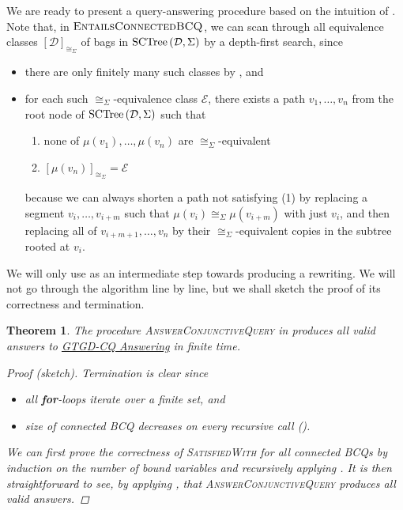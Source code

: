 \documentclass[12pt]{report}
\theoremstyle{plain}
\newtheorem{theorem}{Theorem}[chapter]
\theoremstyle{definition}
\newcommand{\SCTree}[2]{\ensuremath{\normalfont{\textrm{SCTree}} \left( #1, #2 \right)}}
\begin{document}
We are ready to present a query-answering procedure  based on the intuition of . Note that, in $\textsc{EntailsConnectedBCQ}$, we can scan through all equivalence classes $[\mathcal{D}]_{\cong_\Sigma}$ of bags in $\SCTree{\mathcal{D}}{\Sigma}$ by a depth-first search, since
\begin{itemize}
  \item there are only finitely many such classes by , and
  \item for each such $\cong_\Sigma$-equivalence class $\mathcal{E}$, there exists a path $v_1, \ldots, v_n$ from the root node of $\SCTree{\mathcal{D}}{\Sigma}$ such that
  \begin{enumerate}
    \item none of $\mu(v_1), \ldots, \mu(v_n)$ are $\cong_\Sigma$-equivalent
    \item $[\mu(v_n)]_{\cong_\Sigma} = \mathcal{E}$
  \end{enumerate}
  because we can always shorten a path not satisfying (1) by replacing a segment $v_i, \ldots, v_{i+m}$ such that $\mu(v_i) \cong_\Sigma \mu(v_{i+m})$ with just $v_i$, and then replacing all of $v_{i+m+1}, \ldots, v_n$ by their $\cong_\Sigma$-equivalent copies in the subtree rooted at $v_i$.
\end{itemize}

We will only use  as an intermediate step towards producing a rewriting. We will not go through the algorithm line by line, but we shall sketch the proof of its correctness and termination.

\begin{theorem}
  The procedure \textsc{AnswerConjunctiveQuery} in  produces all valid answers to \hyperref[GTGD-CQ-Answering]{GTGD-CQ Answering} in finite time.
  \begin{proof}[Proof (sketch)]
    Termination is clear since
    \begin{itemize}
      \item all \textbf{for}-loops iterate over a finite set, and
      \item size of connected BCQ decreases on every recursive call ().
    \end{itemize}

    We can first prove the correctness of \textsc{SatisfiedWith} for all connected BCQs by induction on the number of bound variables and recursively applying . It is then straightforward to see, by applying , that \textsc{AnswerConjunctiveQuery} produces all valid answers.
  \end{proof}
\end{theorem}
\end{document}
